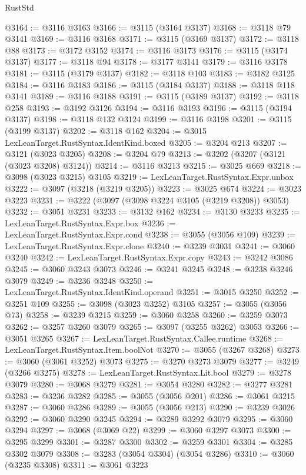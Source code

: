 \begin{lexlean}{RustStd}
\begin{coremodule}
@3164 := @3116 @3163
@3166 := @3115 (@3164 @3137)
@3168 := @3118 @79 @3141
@3169 := @3116 @3168
@3171 := @3115 (@3169 @3137)
@3172 := @3118 @88
@3173 := @3172 @3152
@3174 := @3116 @3173
@3176 := @3115 (@3174 @3137)
@3177 := @3118 @94
@3178 := @3177 @3141
@3179 := @3116 @3178
@3181 := @3115 (@3179 @3137)
@3182 := @3118 @103
@3183 := @3182 @3125
@3184 := @3116 @3183
@3186 := @3115 (@3184 @3137)
@3188 := @3118 @118 @3141
@3189 := @3116 @3188
@3191 := @3115 (@3189 @3137)
@3192 := @3118 @258
@3193 := @3192 @3126
@3194 := @3116 @3193
@3196 := @3115 (@3194 @3137)
@3198 := @3118 @132 @3124
@3199 := @3116 @3198
@3201 := @3115 (@3199 @3137)
@3202 := @3118 @162
@3204 := @3015 LexLeanTarget.RustSyntax.IdentKind.boxed
@3205 := @3204 @213
@3207 := @3121 (@3023 @3205)
@3208 := @3204 @79
@3213 := @3202 (@3207 (@3121 (@3023 @3208) @3124))
@3214 := @3116 @3213
@3215 := @3025 @669
@3218 := @3098 (@3023 @3215) @3105
@3219 := LexLeanTarget.RustSyntax.Expr.unbox
@3222 := @3097 (@3218 (@3219 @3205))
@3223 := @3025 @674
@3224 := @3023 @3223
@3231 := @3222 (@3097 (@3098 @3224 @3105 (@3219 @3208)) @3053)
@3232 := @3051 @3231
@3233 := @3132 @162
@3234 := @3130 @3233
@3235 := LexLeanTarget.RustSyntax.Expr.box
@3236 := LexLeanTarget.RustSyntax.Expr.cond
@3238 := @3055 (@3056 @109)
@3239 := LexLeanTarget.RustSyntax.Expr.clone
@3240 := @3239 @3031
@3241 := @3060 @3240
@3242 := LexLeanTarget.RustSyntax.Expr.copy
@3243 := @3242 @3086
@3245 := @3060 @3243 @3073
@3246 := @3241 @3245
@3248 := @3238 @3246 @3079
@3249 := @3236 @3248
@3250 := LexLeanTarget.RustSyntax.IdentKind.operand
@3251 := @3015 @3250
@3252 := @3251 @109
@3255 := @3098 (@3023 @3252) @3105
@3257 := @3055 (@3056 @73)
@3258 := @3239 @3215
@3259 := @3060 @3258
@3260 := @3259 @3073
@3262 := @3257 @3260 @3079
@3265 := @3097 (@3255 @3262) @3053
@3266 := @3051 @3265
@3267 := LexLeanTarget.RustSyntax.Callee.runtime
@3268 := LexLeanTarget.RustSyntax.Item.boolNot
@3270 := @3055 (@3267 @3268)
@3273 := @3060 (@3061 @3252) @3073
@3275 := @3270 @3273 @3079
@3277 := @3249 (@3266 @3275)
@3278 := LexLeanTarget.RustSyntax.Lit.bool
@3279 := @3278 @3079
@3280 := @3068 @3279
@3281 := @3054 @3280
@3282 := @3277 @3281
@3283 := @3236 @3282
@3285 := @3055 (@3056 @201)
@3286 := @3061 @3215
@3287 := @3060 @3286
@3289 := @3055 (@3056 @213)
@3290 := @3239 @3026
@3292 := @3060 @3290 @3245
@3294 := @3289 @3292 @3079
@3295 := @3060 @3294
@3297 := @3068 (@3069 @22)
@3299 := @3060 @3297 @3073
@3300 := @3295 @3299
@3301 := @3287 @3300
@3302 := @3259 @3301
@3304 := @3285 @3302 @3079
@3308 := @3283 (@3054 @3304) (@3054 @3286)
@3310 := @3060 (@3235 @3308)
@3311 := @3061 @3223

\end{coremodule}
\end{lexlean}
